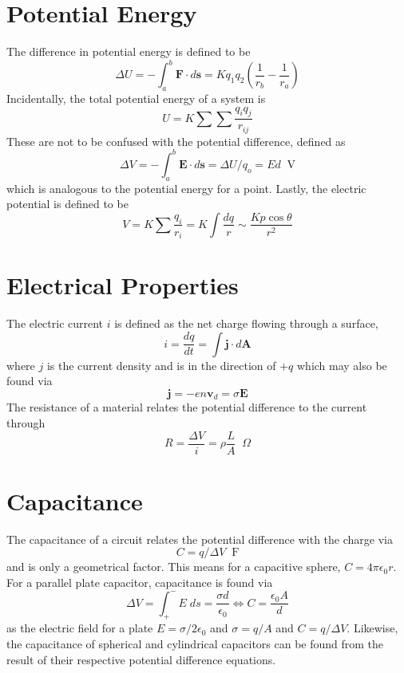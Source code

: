 \documentclass[oneside,11pt]{book}
\renewcommand{\b}{\mathbf}
\newcommand{\unit}[1]{\;\;\mathrm{#1}}
\begin{document}
\section{Potential Energy}
The difference in potential energy is defined to be \begin{equation}
    \Delta U = - \int_a^b \b F \cdot d \b s = Kq_1q_2 \left( \frac{1}{r_b} - \frac{1}{r_a} \right)
\end{equation}
Incidentally, the total potential energy of a system is \begin{equation}
    U = K \sum \sum \frac{q_iq_j}{r_{ij}}
\end{equation}
These are not to be confused with the potential difference, defined as \begin{equation}
    \Delta V = - \int_a^b \b E \cdot d \b s = \Delta U / q_o = Ed \unit{V}
\end{equation}
which is analogous to the potential energy for a point. Lastly, the electric potential is defined to be \begin{equation}
    V = K \sum \frac{q_i}{r_i} = K \int \frac{dq}{r} \sim \frac{K p \cos \theta}{r^2}
\end{equation}

\section{Electrical Properties}
The electric current $i$ is defined as the net charge flowing through a surface, \begin{equation}
    i = \frac{dq}{dt} = \int \b j \cdot d \b A
\end{equation}
where $j$ is the current density and is in the direction of $+q$ which may also be found via \begin{equation}
    \b j = - en \b v_d = \sigma \b E
\end{equation}
The resistance of a material relates the potential difference to the current through \begin{equation}
    R = \frac{\Delta V}{i} = \rho \frac{L}{A} \;\;\Omega
\end{equation}

\section{Capacitance}
The capacitance of a circuit relates the potential difference with the charge via \begin{equation}
    C = q / \Delta V \unit{F}
\end{equation}
and is only a geometrical factor. This means for a capacitive sphere, $C = 4 \pi \epsilon_0 r$. For a parallel plate capacitor, capacitance is found via  \begin{equation}
    \Delta V = \int_+^- E \; ds = \frac{\sigma d}{\epsilon_0} \iff C = \frac{\epsilon_0 A}{d}
\end{equation}
as the electric field for a plate $E = \sigma / 2 \epsilon_0$ and $\sigma = q/A$ and $C = q/\Delta V$. Likewise, the capacitance of spherical and cylindrical capacitors can be found from the result of their respective potential difference equations.
\end{document}
